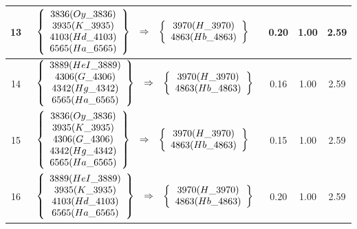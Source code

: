 \begin{longtable}{| c | l | c | c | c |}
13 & $\begin{array}{c c c}\left\{\begin{array}{c}3836 (Oy\_3836) \\ 3935 (K\_3935) \\ 4103 (Hd\_4103) \\ 6565 (Ha\_6565)\end{array}\right\} & \Rightarrow & \left\{\begin{array}{c}3970 (H\_3970) \\ 4863 (Hb\_4863)\end{array}\right\}\end{array}$ & 0.20 & 1.00 & 2.59 \\ \hline
14 & $\begin{array}{c c c}\left\{\begin{array}{c}3889 (HeI\_3889) \\ 4306 (G\_4306) \\ 4342 (Hg\_4342) \\ 6565 (Ha\_6565)\end{array}\right\} & \Rightarrow & \left\{\begin{array}{c}3970 (H\_3970) \\ 4863 (Hb\_4863)\end{array}\right\}\end{array}$ & 0.16 & 1.00 & 2.59 \\ \hline
15 & $\begin{array}{c c c}\left\{\begin{array}{c}3836 (Oy\_3836) \\ 3935 (K\_3935) \\ 4306 (G\_4306) \\ 4342 (Hg\_4342) \\ 6565 (Ha\_6565)\end{array}\right\} & \Rightarrow & \left\{\begin{array}{c}3970 (H\_3970) \\ 4863 (Hb\_4863)\end{array}\right\}\end{array}$ & 0.15 & 1.00 & 2.59 \\ \hline
16 & $\begin{array}{c c c}\left\{\begin{array}{c}3889 (HeI\_3889) \\ 3935 (K\_3935) \\ 4103 (Hd\_4103) \\ 6565 (Ha\_6565)\end{array}\right\} & \Rightarrow & \left\{\begin{array}{c}3970 (H\_3970) \\ 4863 (Hb\_4863)\end{array}\right\}\end{array}$ & 0.20 & 1.00 & 2.59 \\ \hline

\end{longtable}

